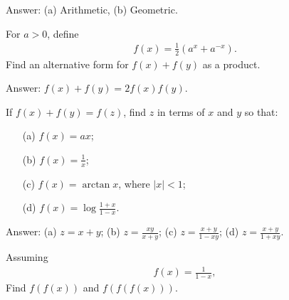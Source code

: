 \begin{solution}[name=Solution by Parviz Shahriari]
Answer: (a) Arithmetic, (b) Geometric.
\end{solution}




\begin{tcolorbox}
\begin{question}
For $a>0$, define
\begin{align*}
    f(x)= \frac{1}{2}\left(a^{x}+a^{-x}\right).
\end{align*}
Find an alternative form for $f(x)+f(y)$ as a product.
\end{question}
\end{tcolorbox}

\begin{solution}[name=Solution by Parviz Shahriari]
Answer: $f(x)+f(y) = 2f(x)f(y)$.
\end{solution}



\begin{tcolorbox}
\begin{question}
If $f(x)+f(y)=f(z)$, find $z$ in terms of $x$ and $y$ so that:
\begin{itemize}
    \item[(a)] $f(x)=ax$;
    \item[(b)] $f(x) = \frac{1}{x}$;
    \item[(c)] $f(x) = \arctan x$, where $|x|<1$;
    \item[(d)] $f(x)=\log \frac{1+x}{1-x}$.
\end{itemize}
\end{question}
\end{tcolorbox}

\begin{solution}[name=Solution by Parviz Shahriari]
Answer: (a) $z=x+y$; (b) $z=\frac{xy}{x+y}$; (c) $z=\frac{x+y}{1-xy}$; (d) $z=\frac{x+y}{1+xy}$. 
\end{solution}




\begin{tcolorbox}
\begin{question}
Assuming
\begin{align*}
    f(x)= \frac{1}{1-x},
\end{align*}
Find $f(f(x))$ and $f(f(f(x)))$.
\end{question}
\end{tcolorbox}

